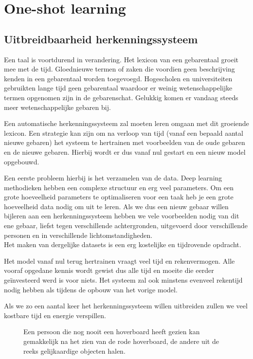\section{One-shot learning}

\subsection{Uitbreidbaarheid herkenningssysteem}
Een taal is voortdurend in verandering.
Het lexicon van een gebarentaal groeit mee met de tijd. Gloednieuwe termen of zaken die voordien geen beschrijving kenden in een gebarentaal worden toegevoegd. Hogescholen en universiteiten gebruikten lange tijd geen gebarentaal waardoor er weinig wetenschappelijke termen opgenomen zijn in de gebarenschat. Gelukkig komen er vandaag steeds meer wetenschappelijke gebaren bij.

\npar Een automatische herkenningssysteem zal moeten leren omgaan met dit groeiende lexicon. Een strategie kan zijn om na verloop van tijd (vanaf een bepaald aantal nieuwe gebaren) het systeem te hertrainen met voorbeelden van de oude gebaren en de nieuwe gebaren. Hierbij wordt er dus vanaf nul gestart en een nieuw model opgebouwd.

\npar Een eerste probleem hierbij is het verzamelen van de data. Deep learning methodieken hebben een complexe structuur en erg veel parameters. Om een grote hoeveelheid parameters te optimaliseren voor een taak heb je een grote hoeveelheid data nodig om uit te leren. Als we dus een nieuw gebaar willen bijleren aan een herkenningssysteem hebben we vele voorbeelden nodig van dit ene gebaar, liefst tegen verschillende achtergronden, uitgevoerd door verschillende personen en in verschillende lichtomstandigheden.
\\ Het maken van dergelijke datasets is een erg kostelijke en tijdrovende opdracht.

\npar Het model vanaf nul terug hertrainen vraagt veel tijd en rekenvermogen. Alle vooraf opgedane kennis wordt gewist dus alle tijd en moeite die eerder ge\"investeerd werd is voor niets. Het systeem zal ook minstens evenveel rekentijd nodig hebben als tijdens de opbouw van het vorige model.

\npar Als we zo een aantal keer het herkenningssysteem willen uitbreiden zullen we veel kostbare tijd en energie verspillen.

\begin{figure}[!t]
	\centering
	\def\svgscale{0.8}
	
	\caption{Een persoon die nog nooit een hoverboard heeft gezien kan gemakkelijk na het zien van de rode hoverboard, de andere uit de reeks gelijkaardige objecten halen. }\label{fig:one-shot-analogie}
\end{figure}

